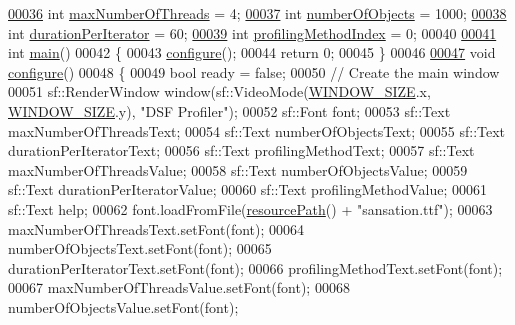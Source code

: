 \begin{DoxyCode}
\hypertarget{main_8cpp_source_l00036}{}\hyperlink{main_8cpp_a4639134a7fa7033334111ff9d77316f3}{00036} \textcolor{keywordtype}{int} \hyperlink{main_8cpp_a4639134a7fa7033334111ff9d77316f3}{maxNumberOfThreads} = 4;
\hypertarget{main_8cpp_source_l00037}{}\hyperlink{main_8cpp_a2303e0afaea24a80ed690de888548862}{00037} \textcolor{keywordtype}{int} \hyperlink{main_8cpp_a2303e0afaea24a80ed690de888548862}{numberOfObjects} = 1000;
\hypertarget{main_8cpp_source_l00038}{}\hyperlink{main_8cpp_a05d9b1ebdb968e99b310a90811f1be91}{00038} \textcolor{keywordtype}{int} \hyperlink{main_8cpp_a05d9b1ebdb968e99b310a90811f1be91}{durationPerIterator} = 60;
\hypertarget{main_8cpp_source_l00039}{}\hyperlink{main_8cpp_a610d48030bfa1d44ea8b35346a1b4b21}{00039} \textcolor{keywordtype}{int} \hyperlink{main_8cpp_a610d48030bfa1d44ea8b35346a1b4b21}{profilingMethodIndex} = 0;
00040 
\hypertarget{main_8cpp_source_l00041}{}\hyperlink{main_8cpp_ae66f6b31b5ad750f1fe042a706a4e3d4}{00041} \textcolor{keywordtype}{int} \hyperlink{main_8cpp_ae66f6b31b5ad750f1fe042a706a4e3d4}{main}()
00042 \{
00043     \hyperlink{main_8cpp_ae369b3765489ee8bd0ea791c1843630f}{configure}();
00044     \textcolor{keywordflow}{return} 0;
00045 \}
00046 
\hypertarget{main_8cpp_source_l00047}{}\hyperlink{main_8cpp_ae369b3765489ee8bd0ea791c1843630f}{00047} \textcolor{keywordtype}{void} \hyperlink{main_8cpp_ae369b3765489ee8bd0ea791c1843630f}{configure}()
00048 \{
00049     \textcolor{keywordtype}{bool} ready = \textcolor{keyword}{false};
00050     \textcolor{comment}{// Create the main window}
00051     sf::RenderWindow window(sf::VideoMode(\hyperlink{main_8cpp_a16e701dc89b4e8467da382318f0d48df}{WINDOW\_SIZE}.x, \hyperlink{main_8cpp_a16e701dc89b4e8467da382318f0d48df}{WINDOW\_SIZE}.y), \textcolor{stringliteral}{"DSF
       Profiler"});
00052     sf::Font font;
00053     sf::Text maxNumberOfThreadsText;
00054     sf::Text numberOfObjectsText;
00055     sf::Text durationPerIteratorText;
00056     sf::Text profilingMethodText;
00057     sf::Text maxNumberOfThreadsValue;
00058     sf::Text numberOfObjectsValue;
00059     sf::Text durationPerIteratorValue;
00060     sf::Text profilingMethodValue;
00061     sf::Text help;
00062     font.loadFromFile(\hyperlink{_resource_path_8hpp_a377b456e3964835648f2d726c2e4f510}{resourcePath}() + \textcolor{stringliteral}{"sansation.ttf"});
00063     maxNumberOfThreadsText.setFont(font);
00064     numberOfObjectsText.setFont(font);
00065     durationPerIteratorText.setFont(font);
00066     profilingMethodText.setFont(font);
00067     maxNumberOfThreadsValue.setFont(font);
00068     numberOfObjectsValue.setFont(font);

\end{DoxyCode}

